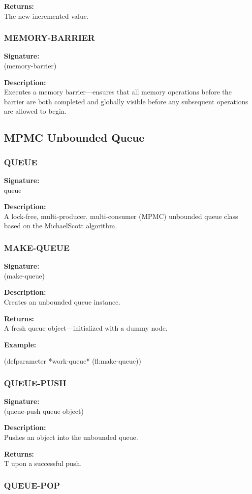 \documentclass[12pt, letterpaper]{article}
\DeclareRobustCommand{\code}[1]{%
	\begingroup
	\setlength{\fboxsep}{2pt}%
	\colorbox{gray!15}{\ttfamily\small #1}%
	\endgroup
}
\newcommand{\customitem}[2]{%
	\noindent\textbf{#1}\\[0.5ex]%
	#2\vspace{1ex}%
}
\begin{document}
	\customitem{Returns:}{The new incremented value.}
	\subsubsection{MEMORY-BARRIER}
	
	\customitem{Signature:}{\code{(memory-barrier)}}
	
	\customitem{Description:}{Executes a memory barrier---ensures that all memory operations before the barrier are both completed and globally visible before any subsequent operations are allowed to begin.}
	\subsection{MPMC Unbounded Queue}
	
	\subsubsection{QUEUE}
	\customitem{Signature:}{\code{queue}}
	
	\customitem{Description:}{A lock-free, multi-producer, multi-consumer (MPMC) unbounded queue class based on the MichaelScott algorithm.}
	\subsubsection{MAKE-QUEUE}
	\customitem{Signature:}{\code{(make-queue)}}
	
	\customitem{Description:}{Creates an unbounded queue instance.}
	
	\customitem{Returns:}{A fresh \code{queue} object---initialized with a dummy node.}
	
	\customitem{Example:}{}
\begin{lispcode}
(defparameter *work-queue* (fl:make-queue))
\end{lispcode}
	\subsubsection{QUEUE-PUSH}
	
	\customitem{Signature:}{\code{(queue-push queue object)}}
	
	\customitem{Description:}{Pushes an \code{object} into the unbounded queue.}
	
	\customitem{Returns:}{\code{T} upon a successful push.}
	\subsubsection{QUEUE-POP}
	
\end{document}
